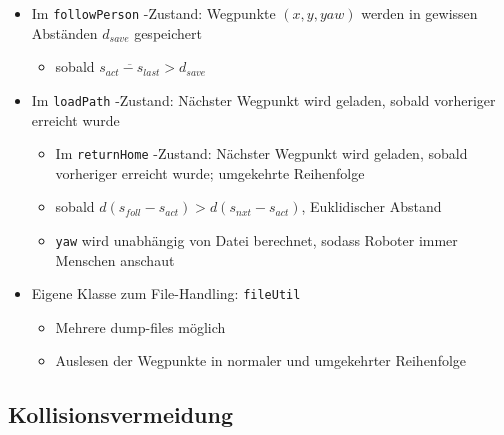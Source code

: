 \begin{itemize}
  \item Im \lstinline{followPerson} -Zustand: Wegpunkte $(x,y,yaw)$ werden in gewissen Abständen $d_{save}$ gespeichert
  \begin{itemize}
    \item sobald $ \overline{ s_{act} - s_{last} } > d_{save} $ 
  \end{itemize}
	\item Im \lstinline{loadPath} -Zustand: Nächster Wegpunkt wird geladen, sobald vorheriger erreicht wurde
  \begin{itemize}
		\item Im \lstinline{returnHome} -Zustand: Nächster Wegpunkt wird geladen, sobald vorheriger erreicht wurde; umgekehrte Reihenfolge
    \item sobald $ d( s_{foll} - s_{act} ) > d( s_{nxt} - s_{act} ) $, Euklidischer Abstand
  	\item \lstinline{yaw} wird unabhängig von Datei berechnet, sodass Roboter immer Menschen anschaut
  \end{itemize}
  \item Eigene Klasse zum File-Handling: \lstinline{fileUtil}
  \begin{itemize}
    \item Mehrere dump-files möglich
    \item Auslesen der Wegpunkte in normaler und umgekehrter Reihenfolge
  \end{itemize}
\end{itemize}



% 
% 


\subsection{Kollisionsvermeidung}
\label{kollisionsvermeidung_subsec}

